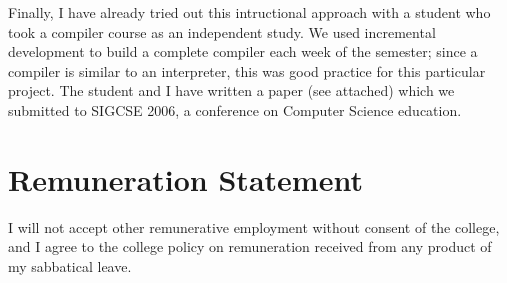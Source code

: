 \documentclass{article}
\begin{document}
Finally, I have already tried out this intructional approach with a student who took a compiler course as an independent study.  We used incremental development to build a complete compiler each week of the semester; since a compiler is similar to an interpreter, this was good practice for this particular project.  The student and I have written a paper (see attached) which we submitted to SIGCSE 2006, a conference on Computer Science education.





\section*{Remuneration Statement}

I will not accept other remunerative employment without consent of the college, and I agree to the college policy on remuneration received from any product of my sabbatical leave.
\end{document}

